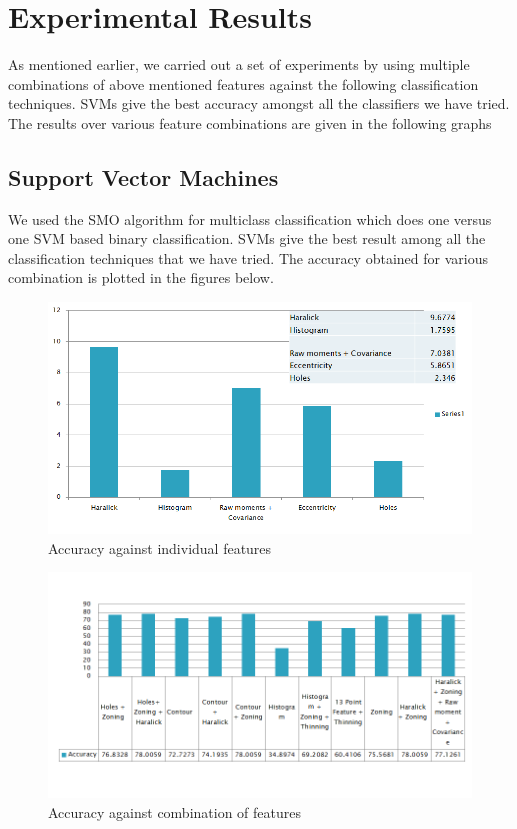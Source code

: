 \documentclass[conference]{IEEEtran}
\begin{document}
\section{Experimental Results}
As mentioned earlier, we carried out a set of experiments by using multiple combinations of above mentioned features against the following classification techniques. SVMs give the best accuracy amongst all the classifiers we have tried. The results over various feature combinations are given in the following graphs\\
\subsection{Support Vector Machines}
We used the SMO algorithm for multiclass classification which does one versus one SVM based binary classification. SVMs give the best result among all the classification techniques that we have tried. The accuracy obtained for various combination is plotted in the figures below. 
\begin{figure}[h]
  \centering
    \includegraphics[scale = 0.4]{SVM_ind.png}
  \caption{Accuracy against individual features }
\end{figure}

\begin{figure}[h]
  \centering
    \includegraphics[scale = 0.4]{SVM_diff.png}
  \caption{Accuracy against combination of features }
\end{figure}
\end{document}
